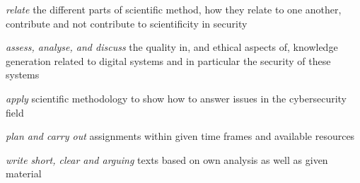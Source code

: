 \usepackage{xparse}
\NewDocumentCommand{\newLO}{m m m}{%
  \expandafter\DeclareDocumentCommand{#1}{s}{%
    \IfBooleanT{##1}{\label{#2}}%
    #3%
}}

{\emph{relate} the different parts of scientific method, how they relate to one 
another, contribute and not contribute to scientificity in security}

{\emph{assess, analyse, and discuss} the quality in, and ethical aspects of, 
knowledge generation related to digital systems and in particular the security 
of these systems}

{\emph{apply} scientific methodology to show how to answer issues in the 
cybersecurity field}

{\emph{plan and carry out} assignments within given time frames and available 
resources}

{\emph{write short, clear and arguing} texts based on own analysis as well as 
given material}
